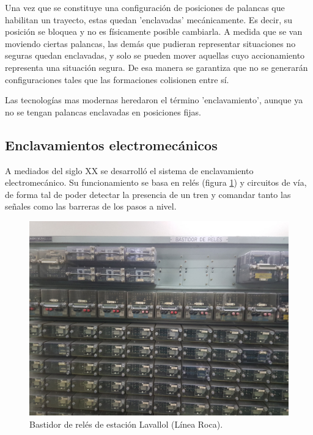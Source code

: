 			Una vez que se constituye una configuración de posiciones de palancas que habilitan un trayecto, estas quedan 'enclavadas' mecánicamente. Es decir, su posición se bloquea y no es físicamente posible cambiarla. A medida que se van moviendo ciertas palancas, las demás que pudieran representar situaciones no seguras quedan enclavadas, y solo se pueden mover aquellas cuyo accionamiento representa una situación segura. De esa manera se garantiza que no se generarán configuraciones tales que las formaciones colisionen entre sí.
			
			Las tecnologías mas modernas heredaron el término 'enclavamiento', aunque ya no se tengan palancas enclavadas en posiciones fijas.
		
		\subsection{Enclavamientos electromecánicos}
			
			A mediados del siglo XX se desarrolló el sistema de enclavamiento electromecánico. Su funcionamiento se basa en relés (figura \ref{fig:Reles}) y circuitos de vía, de forma tal de poder detectar la presencia de un tren y comandar tanto las señales como las barreras de los pasos a nivel.
	
			
			\begin{figure}[htbp!]
				\centering
				\includegraphics[scale=.08]{./Figures/Reles}
				\caption{Bastidor de relés de estación Lavallol (Línea Roca).}
				\label{fig:Reles}
			\end{figure}
		
